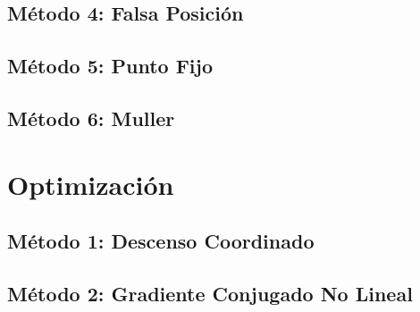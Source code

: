\documentclass[10pt,a4paper]{article}
\begin{document}
	\subsection{Método 4: Falsa Posición}
		
	
	
	\subsection{Método 5: Punto Fijo}
		
	
	
	\subsection{Método 6: Muller}
	
	
		
	\section{Optimización}
	
	\subsection{Método 1: Descenso Coordinado}
	
	
	
	\subsection{Método 2: Gradiente Conjugado No Lineal}
	
	
	
\end{document}
